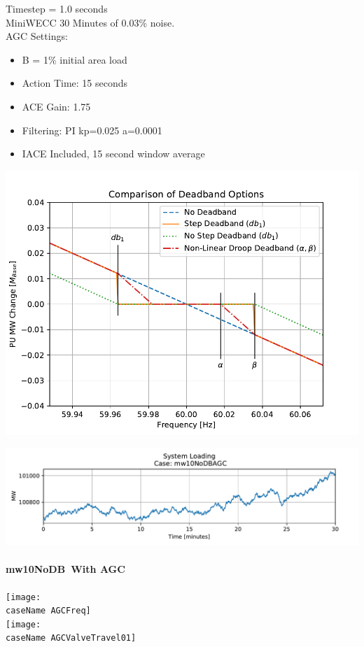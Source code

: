 \documentclass[12pt]{article}
\newcommand{\caseName}{ }
\begin{document}
\begin{minipage}{.5\linewidth}
Timestep = 1.0 seconds\\
MiniWECC 30 Minutes of 0.03\% noise. \\

AGC Settings:
\begin{itemize}
\item B = 1\% initial area load
\item Action Time: 15 seconds
\item ACE Gain: 1.75
\item Filtering: PI kp=0.025 a=0.0001
\item IACE Included, 15 second window average
\end{itemize}
\end{minipage}%
\begin{minipage}{.5\linewidth}
\includegraphics[width=\linewidth]{dbAction3}
\end{minipage}%


\includegraphics[width=\linewidth]{mw10NoDBAGCPload}\\


\pagebreak

\renewcommand{\caseName}{mw10NoDB}
\paragraph{\caseName\ With AGC} 
\begin{center}
	\texttt{[image: \\caseName AGCFreq]}\\
	\texttt{[image: \\caseName AGCValveTravel01]} \\
\end{center}
\end{document}
